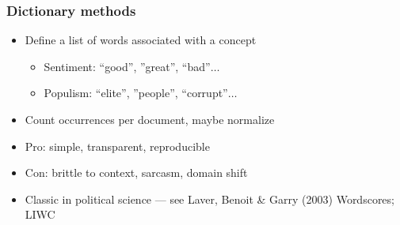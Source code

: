 \begin{frame}
\frametitle{Dictionary methods}
\centering

\begin{itemize}[<+->]
\item Define a list of words associated with a concept
  \begin{itemize}
  \item Sentiment: ``good'', ''great'', ``bad''$\ldots$
  \item Populism: ``elite'', ''people'', ``corrupt''$\ldots$
  \end{itemize}
\vspace{6pt}
\item Count occurrences per document, maybe normalize
\vspace{6pt}
\item Pro: simple, transparent, reproducible
\item Con: brittle to context, sarcasm, domain shift
\vspace{8pt}
\item Classic in political science --- see Laver, Benoit \& Garry (2003) Wordscores; LIWC
\end{itemize}

\end{frame}

